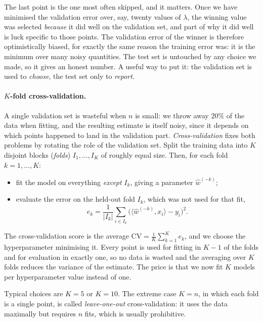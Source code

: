 \begin{remark}
The last point is the one most often skipped, and it matters. Once we have minimised
the validation error over, say, twenty values of $\lambda$, the winning value was
selected \emph{because} it did well on the validation set, and part of why it did well
is luck specific to those points. The validation error of the winner is therefore
optimistically biased, for exactly the same reason the training error was: it is the
minimum over many noisy quantities. The test set is untouched by any choice we made,
so it gives an honest number. A useful way to put it: the validation set is used to
\emph{choose}, the test set only to \emph{report}.
\end{remark}

\paragraph{$K$-fold cross-validation.}
A single validation set is wasteful when $n$ is small: we throw away $20\%$ of the
data when fitting, and the resulting estimate is itself noisy, since it depends on
which points happened to land in the validation part. \emph{Cross-validation} fixes
both problems by rotating the role of the validation set. Split the training data into
$K$ disjoint blocks (\emph{folds}) $I_1, \dots, I_K$ of roughly equal size. Then, for
each fold $k = 1, \dots, K$:
\begin{itemize}
    \item fit the model on everything \emph{except} $I_k$, giving a parameter
    $\hat w^{(-k)}$;
    \item evaluate the error on the held-out fold $I_k$, which was not used for that
    fit,
    \[
    e_k = \frac{1}{|I_k|} \sum_{i \in I_k}
    \big( \langle \hat w^{(-k)}, x_i \rangle - y_i \big)^2 .
    \]
\end{itemize}
The cross-validation score is the average $\mathrm{CV} = \tfrac{1}{K} \sum_{k=1}^K
e_k$, and we choose the hyperparameter minimising it. Every point is used for fitting
in $K-1$ of the folds and for evaluation in exactly one, so no data is wasted and the
averaging over $K$ folds reduces the variance of the estimate. The price is that we
now fit $K$ models per hyperparameter value instead of one.

Typical choices are $K = 5$ or $K = 10$. The extreme case $K = n$, in which each fold
is a single point, is called \emph{leave-one-out} cross-validation: it uses the data
maximally but requires $n$ fits, which is usually prohibitive.


